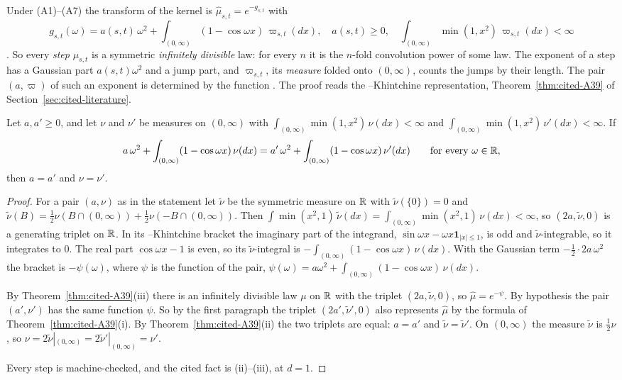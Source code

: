 Under (A1)--(A7) the transform of the kernel is $\widehat\mu_{s,t} = e^{-g_{s,t}}$ with
\[
  g_{s,t}(\omega) = a(s,t)\,\omega^2 + \int_{(0,\infty)}(1 - \cos\omega x)\,\varpi_{s,t}(dx),
  \quad a(s,t) \ge 0, \quad \int_{(0,\infty)}\min(1, x^2)\,\varpi_{s,t}(dx) < \infty
\]
. So every \emph{step} $\mu_{s,t}$ is a
symmetric \emph{infinitely divisible} law: for every $n$ it is the $n$-fold convolution power of
some law. The exponent of a step has a Gaussian part
$a(s,t)\omega^2$ and a jump part, and $\varpi_{s,t}$, its \emph{\Levy{} measure} folded onto
$(0,\infty)$, counts the jumps by their length. The pair $(a, \varpi)$ of such an exponent is
determined by the function . The proof reads the
\Levy--Khintchine representation, Theorem~\ref{thm:cited-A39} of
Section~\ref{sec:cited-literature}.

\begin{theorem}
\label{thm:cited-A9}

Let $a, a' \ge 0$, and let $\nu$ and $\nu'$ be measures on $(0,\infty)$ with
$\int_{(0,\infty)}\min(1, x^2)\,\nu(dx) < \infty$ and
$\int_{(0,\infty)}\min(1, x^2)\,\nu'(dx) < \infty$. If
\[
  a\,\omega^2 + \int_{(0,\infty)}(1 - \cos\omega x)\,\nu(dx)
  = a'\,\omega^2 + \int_{(0,\infty)}(1 - \cos\omega x)\,\nu'(dx)
  \qquad\text{for every } \omega \in \mathbb{R},
\]
then $a = a'$ and $\nu = \nu'$.
\end{theorem}

\begin{proof}
For a pair $(a, \nu)$ as in the statement let $\tilde\nu$ be the symmetric measure on $\mathbb{R}$ with
$\tilde\nu(\{0\}) = 0$ and $\tilde\nu(B) = \tfrac12\nu(B \cap (0,\infty)) +
\tfrac12\nu(-B \cap (0,\infty))$. Then $\int\min(x^2, 1)\,\tilde\nu(dx) =
\int_{(0,\infty)}\min(x^2, 1)\,\nu(dx) < \infty$, so $(2a, \tilde\nu, 0)$ is a generating triplet
on $\mathbb{R}$. In its \Levy--Khintchine bracket the imaginary part of the integrand,
$\sin\omega x - \omega x\mathbf 1_{|x| \le 1}$, is odd and $\tilde\nu$-integrable, so it integrates
to $0$. The real part $\cos\omega x - 1$ is even, so its $\tilde\nu$-integral is
$-\int_{(0,\infty)}(1 - \cos\omega x)\,\nu(dx)$. With the Gaussian term
$-\tfrac12\cdot 2a\,\omega^2$ the bracket is $-\psi(\omega)$, where $\psi$ is the function of the
pair, $\psi(\omega) = a\omega^2 + \int_{(0,\infty)}(1 - \cos\omega x)\,\nu(dx)$.

By Theorem~\ref{thm:cited-A39}(iii) there is an infinitely divisible law $\mu$ on $\mathbb{R}$ with the triplet
$(2a, \tilde\nu, 0)$, so $\widehat\mu = e^{-\psi}$. By hypothesis the pair $(a', \nu')$ has the
same function $\psi$. So by the first paragraph the triplet $(2a', \tilde\nu', 0)$ also represents
$\widehat\mu$ by the formula of Theorem~\ref{thm:cited-A39}(i). By Theorem~\ref{thm:cited-A39}(ii) the two triplets
are equal: $a = a'$ and $\tilde\nu = \tilde\nu'$. On $(0,\infty)$ the measure $\tilde\nu$ is
$\tfrac12\nu$, so $\nu = 2\tilde\nu|_{(0,\infty)} = 2\tilde\nu'|_{(0,\infty)} = \nu'$.

Every step is machine-checked, and the cited fact is (ii)--(iii), at $d = 1$.
\end{proof}

